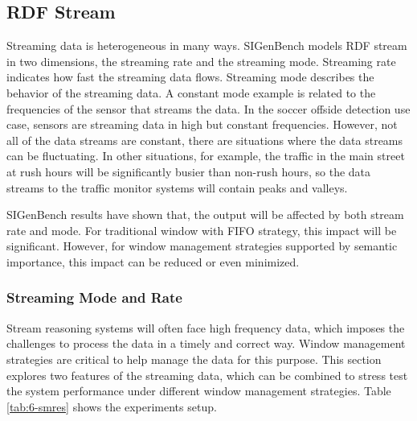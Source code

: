 \subsection{RDF Stream}
Streaming data is heterogeneous in many ways. 
SIGenBench models RDF stream in two dimensions, the streaming rate and the streaming mode.
Streaming rate indicates how fast the streaming data flows. 
Streaming mode describes the behavior of the streaming data.
A constant mode example is related to the frequencies of the sensor that streams the data. 
In the soccer offside detection use case, sensors are streaming data in high but constant frequencies. 
However, not all of the data streams are constant, there are situations where the data streams can be fluctuating. 
In other situations, for example, the traffic in the main street at rush hours will be significantly busier than non-rush hours, so the data streams to the traffic monitor systems will contain peaks and valleys.


SIGenBench results have shown that, the output will be affected by both stream rate and mode.
For traditional window with FIFO strategy, this impact will be significant. 
However, for window management strategies supported by semantic importance, this impact can be reduced or even minimized. 
%
\subsubsection{Streaming Mode and Rate}
Stream reasoning systems will often face high frequency data, which imposes the challenges to process the data in a timely and correct way. 
Window management strategies are critical to help manage the data for this purpose. 
This section explores two features of the streaming data, which can be combined to stress test the system performance under different window management strategies. 
Table \ref{tab:6-smres} shows the experiments setup.

